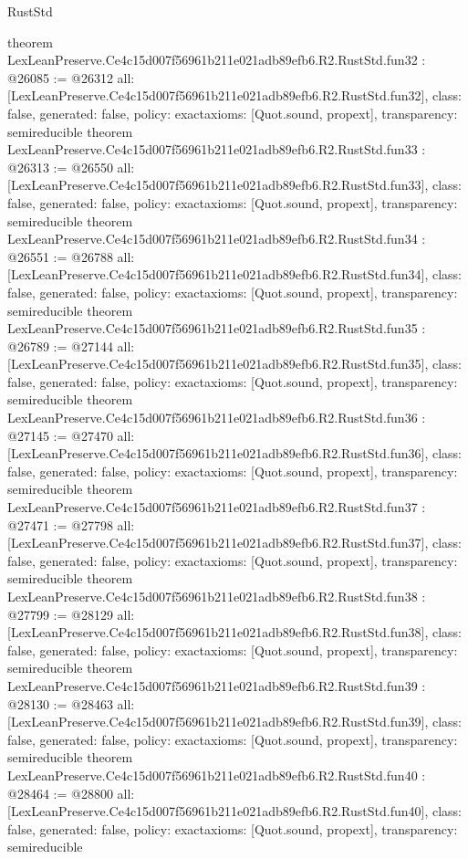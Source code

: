 \begin{lexlean}{RustStd}
\begin{coremodule}
{}
theorem LexLeanPreserve.Ce4c15d007f56961b211e021adb89efb6.R2.RustStd.fun32 : @26085 := @26312 {
  all: [LexLeanPreserve.Ce4c15d007f56961b211e021adb89efb6.R2.RustStd.fun32],
  class: false,
  generated: false,
  policy: exact{axioms: [Quot.sound, propext]},
  transparency: semireducible
}
theorem LexLeanPreserve.Ce4c15d007f56961b211e021adb89efb6.R2.RustStd.fun33 : @26313 := @26550 {
  all: [LexLeanPreserve.Ce4c15d007f56961b211e021adb89efb6.R2.RustStd.fun33],
  class: false,
  generated: false,
  policy: exact{axioms: [Quot.sound, propext]},
  transparency: semireducible
}
theorem LexLeanPreserve.Ce4c15d007f56961b211e021adb89efb6.R2.RustStd.fun34 : @26551 := @26788 {
  all: [LexLeanPreserve.Ce4c15d007f56961b211e021adb89efb6.R2.RustStd.fun34],
  class: false,
  generated: false,
  policy: exact{axioms: [Quot.sound, propext]},
  transparency: semireducible
}
theorem LexLeanPreserve.Ce4c15d007f56961b211e021adb89efb6.R2.RustStd.fun35 : @26789 := @27144 {
  all: [LexLeanPreserve.Ce4c15d007f56961b211e021adb89efb6.R2.RustStd.fun35],
  class: false,
  generated: false,
  policy: exact{axioms: [Quot.sound, propext]},
  transparency: semireducible
}
theorem LexLeanPreserve.Ce4c15d007f56961b211e021adb89efb6.R2.RustStd.fun36 : @27145 := @27470 {
  all: [LexLeanPreserve.Ce4c15d007f56961b211e021adb89efb6.R2.RustStd.fun36],
  class: false,
  generated: false,
  policy: exact{axioms: [Quot.sound, propext]},
  transparency: semireducible
}
theorem LexLeanPreserve.Ce4c15d007f56961b211e021adb89efb6.R2.RustStd.fun37 : @27471 := @27798 {
  all: [LexLeanPreserve.Ce4c15d007f56961b211e021adb89efb6.R2.RustStd.fun37],
  class: false,
  generated: false,
  policy: exact{axioms: [Quot.sound, propext]},
  transparency: semireducible
}
theorem LexLeanPreserve.Ce4c15d007f56961b211e021adb89efb6.R2.RustStd.fun38 : @27799 := @28129 {
  all: [LexLeanPreserve.Ce4c15d007f56961b211e021adb89efb6.R2.RustStd.fun38],
  class: false,
  generated: false,
  policy: exact{axioms: [Quot.sound, propext]},
  transparency: semireducible
}
theorem LexLeanPreserve.Ce4c15d007f56961b211e021adb89efb6.R2.RustStd.fun39 : @28130 := @28463 {
  all: [LexLeanPreserve.Ce4c15d007f56961b211e021adb89efb6.R2.RustStd.fun39],
  class: false,
  generated: false,
  policy: exact{axioms: [Quot.sound, propext]},
  transparency: semireducible
}
theorem LexLeanPreserve.Ce4c15d007f56961b211e021adb89efb6.R2.RustStd.fun40 : @28464 := @28800 {
  all: [LexLeanPreserve.Ce4c15d007f56961b211e021adb89efb6.R2.RustStd.fun40],
  class: false,
  generated: false,
  policy: exact{axioms: [Quot.sound, propext]},
  transparency: semireducible
}
\end{coremodule}
\end{lexlean}
